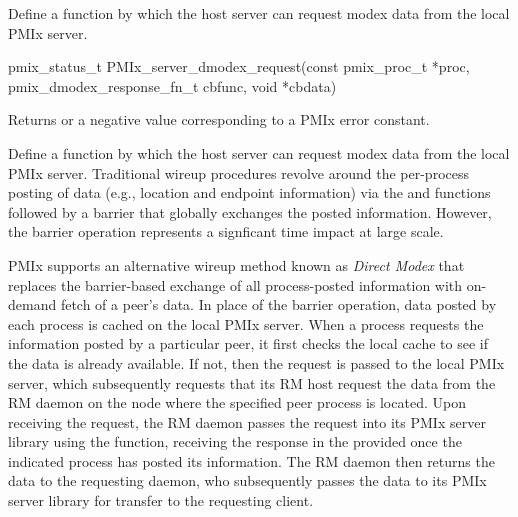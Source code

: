 \summary

Define a function by which the host server can request modex data from the local PMIx server.

\format

\cspecificstart
\begin{codepar}
pmix_status_t PMIx_server_dmodex_request(const pmix_proc_t *proc,
                        pmix_dmodex_response_fn_t cbfunc,
                        void *cbdata)
\end{codepar}
\cspecificend

\begin{arglist}
\end{arglist}

Returns  or a negative value corresponding to a PMIx error constant.

\descr

Define a function by which the host server can request modex data from the local \ac{PMIx} server. Traditional wireup procedures revolve around the per-process posting of data (e.g., location and endpoint information) via the  and  functions followed by a  barrier that globally exchanges the posted information. However, the barrier operation represents a signficant time impact at large scale.

\ac{PMIx} supports an alternative wireup method known as \textit{Direct Modex} that replaces the barrier-based exchange of all process-posted information with on-demand fetch of a peer's data. In place of the barrier operation, data posted by each process is cached on the local \ac{PMIx} server. When a process requests the information posted by a particular peer, it first checks the local cache to see if the data is already available. If not, then the request is passed to the local \ac{PMIx} server, which subsequently requests that its \ac{RM} host request the data from the \ac{RM} daemon on the node where the specified peer process is located. Upon receiving the request, the \ac{RM} daemon passes the request into its \ac{PMIx} server library using the  function, receiving the response in the provided  once the indicated process has posted its information. The \ac{RM} daemon then returns the data to the requesting daemon, who subsequently passes the data to its \ac{PMIx} server library for transfer to the requesting client.

